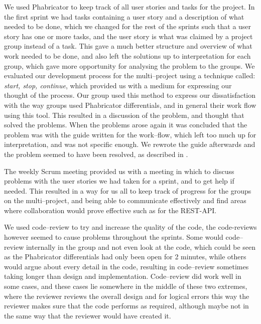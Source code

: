 We used Phabricator to keep track of all user stories and tasks for the project.
In the first sprint we had tasks containing a user story and a description of what needed to be done, which we changed for the rest of the sprints such that a user story has one or more tasks, and the user story is what was claimed by a project group instead of a task.
This gave a much better structure and overview of what work needed to be done, and also left the solutions up to interpretation for each group, which gave more opportunity for analysing the problem to the groups.
We evaluated our development process for the multi--project using a technique called: \textit{start, stop, continue}, which provided us with a medium for expressing our thought of the process.
Our group used this method to express our dissatisfaction with the way groups used Phabricator differentials, and in general their work flow using this tool.
This resulted in a discussion of the problem, and thought that solved the problems.
When the problems arose again it was concluded that the problem was with the guide written for the work--flow, which left too much up for interpretation, and was not specific enough.
We rewrote the guide afterwards and the problem seemed to have been resolved, as described in .

The weekly Scrum meeting provided us with a meeting in which to discuss problems with the user stories we had taken for a sprint, and to get help if needed.
This resulted in a way for us all to keep track of progress for the groups on the multi--project, and being able to communicate effectively and find areas where collaboration would prove effective such as for the REST-API.

We used code--review to try and increase the quality of the code, the code-reviews however seemed to cause problems throughout the sprints.
Some would code--review internally in the group and not even look at the code, which could be seen as the Phabricator differentials had only been open for 2 minutes, while others would argue about every detail in the code, resulting in code--review sometimes taking longer than design and implementation.
Code--review did work well in some cases, and these cases lie somewhere in the middle of these two extremes, where the reviewer reviews the overall design and for logical errors this way the reviewer makes sure that the code performs as required, although maybe not in the same way that the reviewer would have created it.

